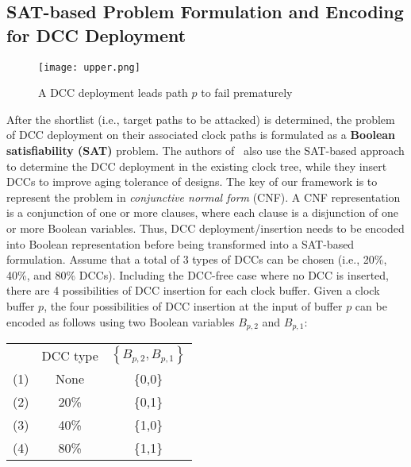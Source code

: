 \subsection{SAT-based Problem Formulation and Encoding for DCC Deployment}
\label{sec:frame:sat}
\begin{comment}
	\begin{figure*}[!ht]
    	\centering
    	\subfigure[A DCC deployment leads path $p$ to fail prematurely]{
    		\label{fig:sub:upper}
        		\texttt{[image: upper.png]}
    	}
   	\hspace{0.1cm}
    	\subfigure[A DCC deployment leads path $p$ to fail post-maturely]{
    		\label{fig:sub:lower}
        		\texttt{[image: lower.png]}
    	}
    	\caption{Illustrative example for the proposed framework based on DCC deployment/insertion}
    	\label{fig:en}
	\end{figure*}
\end{comment}
\begin{figure}
    	\centering
        	\texttt{[image: upper.png]}
       	\caption{A DCC deployment leads path $p$ to fail prematurely}
    	\label{fig:sec:prefail}
\end{figure}
After the shortlist (i.e., target paths to be attacked) is determined, the problem of DCC deployment on their associated clock paths is formulated as a \textbf{Boolean satisfiability (SAT)} problem. The authors of~\cite{wu2018maui} also use the SAT-based approach to determine the DCC deployment in the existing clock tree, while they insert DCCs to improve aging tolerance of designs. The key of our framework is to represent the problem in \textit{conjunctive normal form} (CNF). A CNF representation is a conjunction of one or more clauses, where each clause is a disjunction of one or more Boolean variables. Thus, DCC deployment/insertion needs to be encoded into Boolean representation before being transformed into a SAT-based formulation. Assume that a total of 3 types of DCCs can be chosen (i.e., 20\%, 40\%, and 80\% DCCs). Including the DCC-free case where no DCC is inserted, there are 4 possibilities of DCC insertion for each clock buffer. Given a clock buffer $p$, the four possibilities of DCC insertion at the input of buffer $p$ can be encoded as follows using two Boolean variables $B_{p,2}$ and $B_{p,1}$:

{\small
\begin{tabular}{ c c c }
   & DCC type & $\left\{B_{p,2},B_{p,1}\right\}$ \\
  (1)\quad & None & \{0,0\} \\
  (2)\quad & 20\% &  \{0,1\} \\
  (3)\quad & 40\% &  \{1,0\} \\
  (4)\quad & 80\% &  \{1,1\} \\
\end{tabular}}

